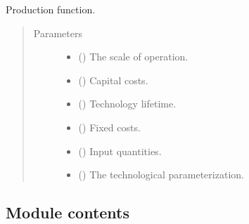 \documentclass[letterpaper,10pt,english]{sphinxmanual}
\begin{document}

\begin{fulllineitems}
\label{\detokenize{technology:technology.tutorial_basic.production}}
Production function.
\begin{quote}\begin{description}
\item[{Parameters}] \leavevmode\begin{itemize}
\item {} 
 () \textendash{} The scale of operation.

\item {} 
 () \textendash{} Capital costs.

\item {} 
 () \textendash{} Technology lifetime.

\item {} 
 () \textendash{} Fixed costs.

\item {} 
 () \textendash{} Input quantities.

\item {} 
 () \textendash{} The technological parameterization.

\end{itemize}

\end{description}\end{quote}

\end{fulllineitems}



\subsection{Module contents}
\label{\detokenize{technology:module-technology}}\label{\detokenize{technology:module-contents}}
\end{document}
